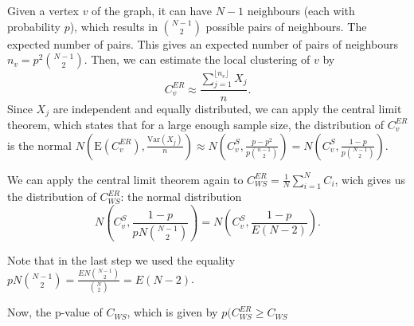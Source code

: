 \documentclass[paper=a4, fontsize=11pt]{scrartcl} %
\newcommand{\E}{\mathrm{E}}
\newcommand{\Var}{\mathrm{Var}}
\begin{document}
Given a vertex $v$ of the graph, it can have $N-1$ neighbours (each with probability $p$), which results in $\binom{N-1}{2}$ possible pairs of neighbours. The expected number of pairs. This gives an expected number of pairs of neighbours $n_v=p^2\binom{N-1}{2}$.  Then, we can estimate the local clustering of $v$ by $$C_v^{ER}\approx \frac{\sum_{j=1}^{\lfloor n_v\rfloor}X_j}{n}.$$
Since $X_j$ are independent and equally distributed, we can apply the central limit theorem, which states that for a large enough sample size, the distribution of $C_v^{ER}$ is the normal $N(\E(C_v^{ER}),\frac{\Var(X_j)}{n})\approx N(C_v^S,\frac{p-p^2}{p\binom{n-1}{2}})=N(C_v^S,\frac{1-p}{p\binom{N-1}{2}})$. 

We can apply the central limit theorem again to $C_{WS}^{ER}=\frac{1}{N}\sum_{i=1}^NC_i$, wich gives us the distribution of $C_{WS}^{ER}$: the normal distribution $$N(C_v^S,\frac{1-p}{pN\binom{N-1}{2}})=N(C_v^S,\frac{1-p}{E(N-2)}).$$


Note that in the last step we used the equality $pN\binom{N-1}{2}=\frac{EN\binom{N-1}{2}}{\binom{N}{2}}=E(N-2)$.

Now, the p-value of $C_{WS}$, which is given by $p(C_{WS}^{ER}\geq C_{WS}$
\end{document}
